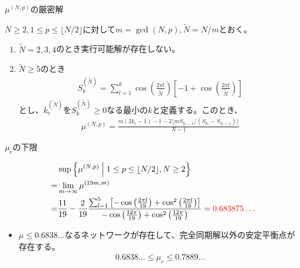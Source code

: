 
\begin{frame}{$\mu^{(N,p)}$の厳密解}
\begin{theorem}[$\mu^{(N,p)}$]
$N\geq2,1\leq p\leq\lfloor N/2\rfloor$に対して$m=\gcd(N,p),\widetilde{N}=N/m$とおく。
\begin{enumerate}
\item $\widetilde{N}=2,3,4$のとき実行可能解が存在しない。%
\item $\widetilde{N}\geq 5$のとき
\begin{align*}
    S_{k}^{(\widetilde{N})}=\sum_{l=1}^{k}\cos\left(\frac{2\pi l}{\widetilde{N}}\right)\left[-1+\cos\left(\frac{2\pi l}{\widetilde{N}}\right)\right]
\end{align*}
とし、$k_{\mathrm{c}}^{(\widetilde{N})}$を$S_{k}^{(\widetilde{N})}\geq0$なる最小の$k$と定義する。このとき、
\begin{align*}
    \mu^{(N,p)}=\frac{m(2k_{\mathrm{c}}-1)-1-2\lfloor mS_{k_{\mathrm{c}}-1}/(S_{k_{\mathrm{c}}}-S_{k_{\mathrm{c}}-1})\rfloor}{N-1}
\end{align*}
\end{enumerate}
\end{theorem}
\end{frame}

\begin{frame}{$\mu_{\mathrm{c}}$の下限}
\begin{theorem}[$\sup \mu^{(N,p)}$]
\begin{align*}
    &\sup\left\{\mu^{(N,p)} \mathrel{}\middle|\mathrel{} 1\leq p\leq \lfloor N/2\rfloor, N\geq2\right\}\\
    =&\lim_{m\to\infty}\mu^{(19m,m)}\\
    =&\frac{11}{19}-\frac{2}{19}\frac{\sum_{l=1}^{5}\left[-\cos\left(\frac{2\pi l}{19}\right)+\cos^{2}\left(\frac{2\pi l}{19}\right)\right]}{-\cos\left(\frac{12\pi}{19}\right)+\cos^{2}\left(\frac{12\pi}{19}\right)}=\textcolor{red}{0.683875\dots}
\end{align*}
\end{theorem}
\begin{itemize}
\item $\mu\leq 0.6838\dots$なるネットワークが存在して、完全同期解以外の安定平衡点が存在する。
\begin{align*}
    0.6838\dots\leq\mu_{\mathrm{c}}\leq0.7889\dots
\end{align*}
\end{itemize}
\end{frame}

